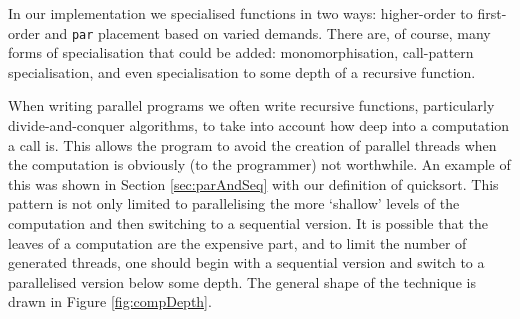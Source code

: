 In our implementation we specialised functions in two ways: higher-order to
first-order and \verb|par| placement based on varied demands. There are, of
course, many forms of specialisation that could be added: monomorphisation,
call-pattern specialisation, and even specialisation to some depth of a
recursive function. 

%

When writing parallel programs we often write recursive functions, particularly
divide-and-conquer algorithms, to take into account how deep into a
computation a call is. This allows the program to avoid the creation of
parallel threads when the computation is obviously (to the programmer) not
worthwhile. An example of this was shown in Section \ref{sec:parAndSeq} with
our definition of \<quicksort\>. This pattern is not only limited to
parallelising the more `shallow' levels of the computation and then switching to a
sequential version. It is possible that the leaves of a computation are the
expensive part, and to limit the number of generated
threads, one should begin with a sequential version and switch to a parallelised
version below some depth. The general shape of the technique is drawn in Figure
\ref{fig:compDepth}.

